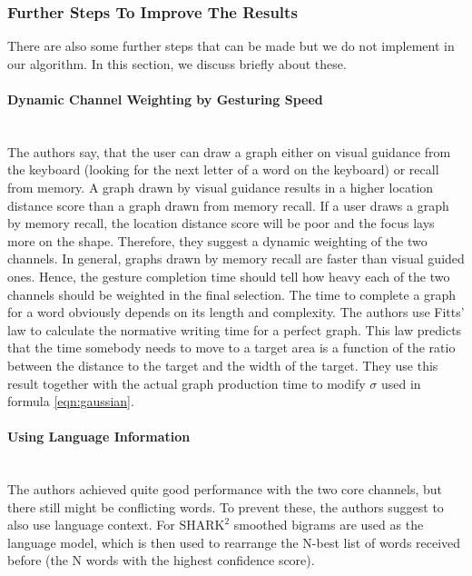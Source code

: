 \subsubsection{Further Steps To Improve The Results}
There are also some further steps that can be made but we do not implement in our algorithm. In this section, we discuss briefly about these.
\paragraph{Dynamic Channel Weighting by Gesturing Speed}\
\label{gesturing speed}\\
The authors say, that the user can draw a graph either on visual guidance from the keyboard (looking for the next letter of a word on the keyboard) or recall from memory. A graph drawn by visual guidance results in a higher location distance score than a graph drawn from memory recall. If a user draws a graph by memory recall, the location distance score will be poor and the focus lays more on the shape. Therefore, they suggest a dynamic weighting of the two channels. In general, graphs drawn by memory recall are faster than visual guided ones. Hence, the gesture completion time should tell how heavy each of the two channels should be weighted in the final selection. The time to complete a graph for a word obviously depends on its length and complexity. The authors use Fitts' law to calculate the normative writing time for a perfect graph. This law predicts that the time somebody needs to move to a target area is a function of the ratio between the distance to the target and the width of the target. They use this result together with the actual graph production time to modify $\sigma$ used in formula \ref{eqn:gaussian}.\\
\paragraph{Using Language Information}\ \\
The authors achieved quite good performance with the two core channels, but there still might be conflicting words. To prevent these, the authors suggest to also use language context. For $\text{SHARK}^2$ smoothed bigrams are used as the language model, which is then used to rearrange the N-best list of words received before (the N words with the highest confidence score).

